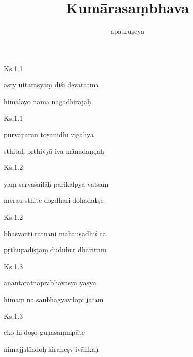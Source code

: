 \documentclass{tufte-handout}
\title{Kumārasaṃbhava}
\author{apauruṣeya}
\newenvironment{sanskrit}%
{\begin{otherlanguage}{sanskrit-devanagari}}%
{\end{otherlanguage}}
\begin{document}
\maketitle


    
	\begin{sanskrit}
	
	    
		Ks.1.1 
    
	    
		asty uttarasyāṃ diśi devatātmā 
    
	    
		himālayo nāma nagādhirājaḥ 
    
	\end{sanskrit}

    
	\begin{sanskrit}
	
	    
		Ks.1.1 
    
	    
		pūrvāparau toyanidhī vigāhya 
    
	    
		sthitaḥ pṛthivyā iva mānadaṇḍaḥ 
    
	\end{sanskrit}

    
	\begin{sanskrit}
	
	    
		Ks.1.2 
    
	    
		yaṃ sarvaśailāḥ parikalpya vatsaṃ 
    
	    
		merau sthite dogdhari dohadakṣe 
    
	\end{sanskrit}

    
	\begin{sanskrit}
	
	    
		Ks.1.2 
    
	    
		bhāsvanti ratnāni mahauṣadhīś ca 
    
	    
		pṛthūpadiṣṭāṃ duduhur dharitrīm 
    
	\end{sanskrit}

    
	\begin{sanskrit}
	
	    
		Ks.1.3 
    
	    
		anantaratnaprabhavasya yasya 
    
	    
		himaṃ na saubhāgyavilopi jātam 
    
	\end{sanskrit}

    
	\begin{sanskrit}
	
	    
		Ks.1.3 
    
	    
		eko hi doṣo guṇasaṃnipāte 
    
	    
		nimajjatīndoḥ kiraṇeṣv ivāṅkaḥ 
    
	\end{sanskrit}
\end{document}
